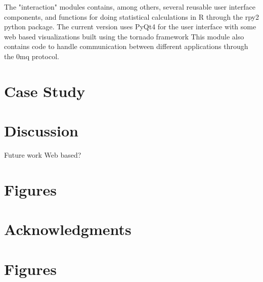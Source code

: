 \documentclass[utf8]{frontiersSCNS} %
\begin{document}
The "interaction" modules contains, among others, several reusable user interface components, and functions for doing statistical calculations in R\citep{team_r:_2012} through the rpy2 \citep{gautier_rpy2:_2008} python package. The current version uses PyQt4 for the user interface with some web based visualizations built using the tornado\citep{server_source_2008} framework  This module also contains code to handle communication between different applications through the 0mq protocol\citep{hintjens_zeromq:_2013}.

\section{Case Study}

\section{Discussion}

Future work
Web based?
\section{Figures}

\section*{Acknowledgments}





\section*{Figures}
\end{document}
